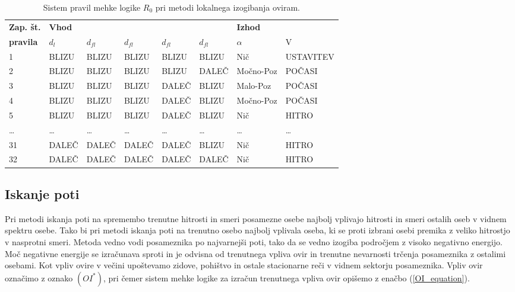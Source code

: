 \documentclass[9pt]{pnas-new}
\begin{document}
\begin{table}[]
\centering
\begin{tabular}{|l|lllll|ll|}
\hline
\textbf{Zap. št.} & \multicolumn{5}{l|}{\textbf{Vhod}} & \multicolumn{2}{l|}{\textbf{Izhod}} \\ 
\cline{2-8} 
\textbf{pravila} & ${d_l}$ & ${d_{fl}}$ & ${d_{fl}}$ & ${d_{fl}}$ & ${d_{fl}}$ & ${\alpha}$ & V \\ 
\hline
1   & BLIZU & BLIZU & BLIZU & BLIZU & BLIZU & Nič           & USTAVITEV  \\ \hline
2   & BLIZU & BLIZU & BLIZU & BLIZU & DALEČ & Močno-Poz     & POČASI     \\ \hline
3   & BLIZU & BLIZU & BLIZU & DALEČ & BLIZU & Malo-Poz      & POČASI     \\ \hline
4   & BLIZU & BLIZU & BLIZU & DALEČ & BLIZU & Močno-Poz     & POČASI     \\ \hline
5   & BLIZU & BLIZU & BLIZU & DALEČ & BLIZU & Nič           & HITRO      \\ \hline
\dots & \dots  & \dots  & \dots  & \dots  & \dots  & \dots  & \dots      \\ \hline
31  & DALEČ & DALEČ & DALEČ & DALEČ & BLIZU & Nič           & HITRO      \\ \hline
32  & DALEČ & DALEČ & DALEČ & DALEČ & DALEČ & Nič           & HITRO      \\ \hline
\end{tabular}
\caption{Sistem pravil mehke logike $R_0$ pri metodi lokalnega izogibanja oviram.}
\label{rules_obstacle_avoidance_behaviour}
\end{table}

\subsection*{Iskanje poti}
\label{iskanje_poti}
Pri metodi iskanja poti na spremembo trenutne hitrosti in smeri posamezne osebe najbolj vplivajo hitrosti in smeri ostalih oseb v vidnem spektru osebe. Tako bi pri metodi iskanja poti na trenutno osebo najbolj vplivala oseba, ki se proti izbrani osebi premika z veliko hitrostjo v nasprotni smeri. Metoda vedno vodi posameznika po najvarnejši poti, tako da se vedno izogiba področjem z visoko negativno energijo. Moč negativne energije se izračunava sproti in je odvisna od trenutnega vpliva ovir in trenutne nevarnosti trčenja posameznika z ostalimi osebami. Kot vpliv ovire v večini upoštevamo zidove, pohištvo in ostale stacionarne reči v vidnem sektorju posameznika. Vpliv ovir označimo z oznako ${(OI^*)}$, pri čemer sistem mehke logike za izračun trenutnega vpliva ovir opišemo z enačbo (\ref{OI_equation}).
\end{document}

